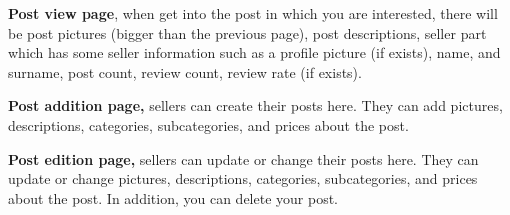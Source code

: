 \textbf{Post view page}, when get into the post in which you are interested, there will be post pictures (bigger than the previous page), post descriptions, seller part which has some seller information such as a profile picture (if exists), name, and surname, post count, review count, review rate (if exists). \newline

\textbf{Post addition page,} sellers can create their posts here. They can add pictures, descriptions, categories, subcategories, and prices about the post.\newline

\textbf{Post edition page,} sellers can update or change their posts here. They can update or change pictures, descriptions, categories, subcategories, and prices about the post. In addition, you can delete your post.\newline

